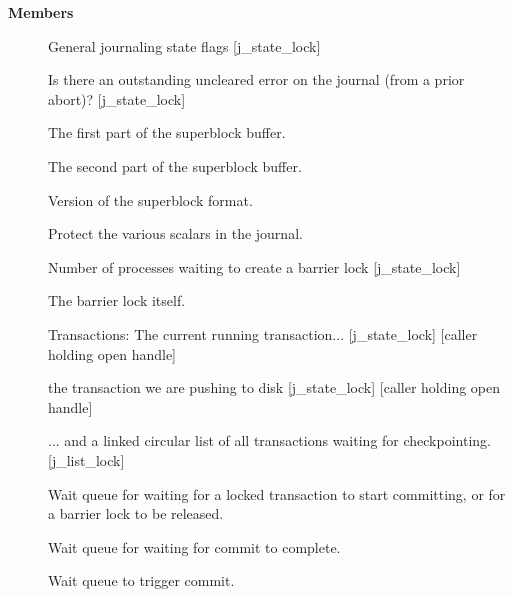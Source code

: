 \documentclass[a4paper,8pt,english]{sphinxmanual}
\begin{document}
\textbf{Members}
\begin{description}
\item[{}] \leavevmode
General journaling state flags {[}j\_state\_lock{]}

\item[{}] \leavevmode
Is there an outstanding uncleared error on the journal (from a prior
abort)? {[}j\_state\_lock{]}

\item[{}] \leavevmode
The first part of the superblock buffer.

\item[{}] \leavevmode
The second part of the superblock buffer.

\item[{}] \leavevmode
Version of the superblock format.

\item[{}] \leavevmode
Protect the various scalars in the journal.

\item[{}] \leavevmode
Number of processes waiting to create a barrier lock {[}j\_state\_lock{]}

\item[{}] \leavevmode
The barrier lock itself.

\item[{}] \leavevmode
Transactions: The current running transaction...
{[}j\_state\_lock{]} {[}caller holding open handle{]}

\item[{}] \leavevmode
the transaction we are pushing to disk
{[}j\_state\_lock{]} {[}caller holding open handle{]}

\item[{}] \leavevmode
... and a linked circular list of all transactions waiting for
checkpointing. {[}j\_list\_lock{]}

\item[{}] \leavevmode
Wait queue for waiting for a locked transaction to start committing,
or for a barrier lock to be released.

\item[{}] \leavevmode
Wait queue for waiting for commit to complete.

\item[{}] \leavevmode
Wait queue to trigger commit.


\end{description}
\end{document}
